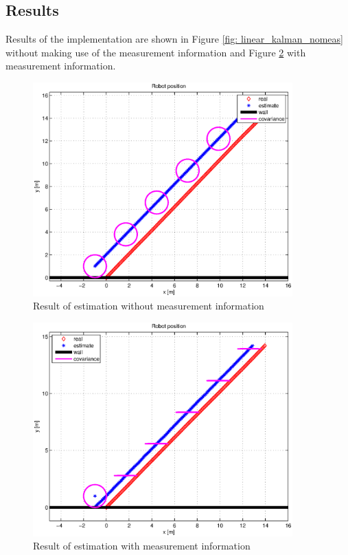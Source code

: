 \documentclass[a4paper,10pt]{report}
\begin{document}
\subsection{Results}
Results of the implementation are shown in Figure \ref{fig:
  linear_kalman_nomeas} without making use of the measurement
information and Figure \ref{fig: linear_kalman_meas} with measurement
information.
\begin{figure}
\center
\includegraphics[width=10cm]{robot_kalman_nomeas.eps}
\caption{Result of estimation without measurement information}
\label{fig: linear_kalman_nomeas}
\end{figure}

\begin{figure}
\center
\includegraphics[width=10cm]{robot_kalman_meas.eps}%
\caption{Result of estimation with measurement information}
\label{fig: linear_kalman_meas}
\end{figure}
\end{document}
